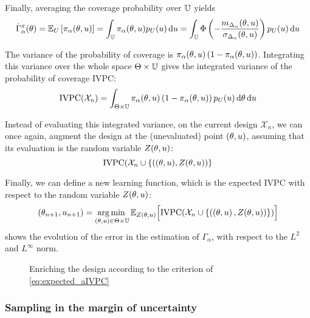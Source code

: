 \documentclass[../../Main_ManuscritThese.tex]{subfiles}
\newcommand\imgpath{/home/victor/acadwriting/Manuscrit/Text/Chapter4/img/}
\begin{document}
Finally, averaging the coverage probability over $\mathbb{U}$ yields
\begin{equation}
  \hat{\Gamma}_{\alpha}^{\pi}(\theta) = \mathbb{E}_U\left[\pi_{\alpha}(\theta,u)\right]=\int_{\mathbb{U}}\pi_{\alpha}(\theta,u)p_{U}(u) \,\mathrm{d}u = \int_{\mathbb{U}}\Phi\left(-\frac{m_{\Delta_\alpha}(\theta,u)}{\sigma_{\Delta_\alpha}(\theta,u)}\right)p_{U}(u) \,\mathrm{d}u
\end{equation}

The variance of the probability of coverage is $\pi_\alpha(\theta, u) \left(1 - \pi_{\alpha}(\theta,u)\right)$.
Integrating this variance over the whole space $\Theta \times \mathbb{U}$ gives the integrated variance of the probability of coverage $\mathrm{IVPC}$:
\cite{bect_sequential_2012}
\begin{equation}
  \label{eq:IVPC_def}
\mathrm{IVPC}(\mathcal{X}_n) =  \int_{\Theta \times \mathbb{U}} \pi_{\alpha}(\theta, u) \left(1 - \pi_{\alpha}(\theta, u)\right)p_{U}(u)\,\mathrm{d}\theta \,\mathrm{d}u
\end{equation}

Instead of evaluating this integrated variance, on the current design $\mathcal{X}_n$, we can once again, augment the design at the (unevaluated) point $(\theta, u)$, assuming that its evaluation is the random variable $Z(\theta, u)$:
\begin{equation}
  \mathrm{IVPC}(\mathcal{X}_n \cup \{((\theta, u), Z(\theta, u))\}
\end{equation}

Finally, we can define a new learning function, which is the expected $\mathrm{IVPC}$ with respect to the random variable $Z(\theta, u)$:
\begin{equation}
  \label{eq:expected_aIVPC}
 (\theta_{n+1},u_{n+1}) = \operatorname*{arg\,min \,}_{(\theta, u)\in \Theta\times\mathbb{U}} \mathbb{E}_{Z(\theta, u)}\Big[\mathrm{IVPC}(\mathcal{X}_n \cup \{   \left(\left(\theta, u \right), Z(\theta, u) \right)  \} )     \Big]
\end{equation}
 shows the evolution of the error in the estimation of $\Gamma_{\alpha}$, with respect to the $L^2$ and $L^{\infty}$ norm.
\begin{figure}[ht]
  \centering
  
  \caption{\label{fig:IVPC_enrichment} Enriching the design according to the criterion of \cref{eq:expected_aIVPC}}
\end{figure}

\subsubsection{Sampling in the margin of uncertainty}
\end{document}
